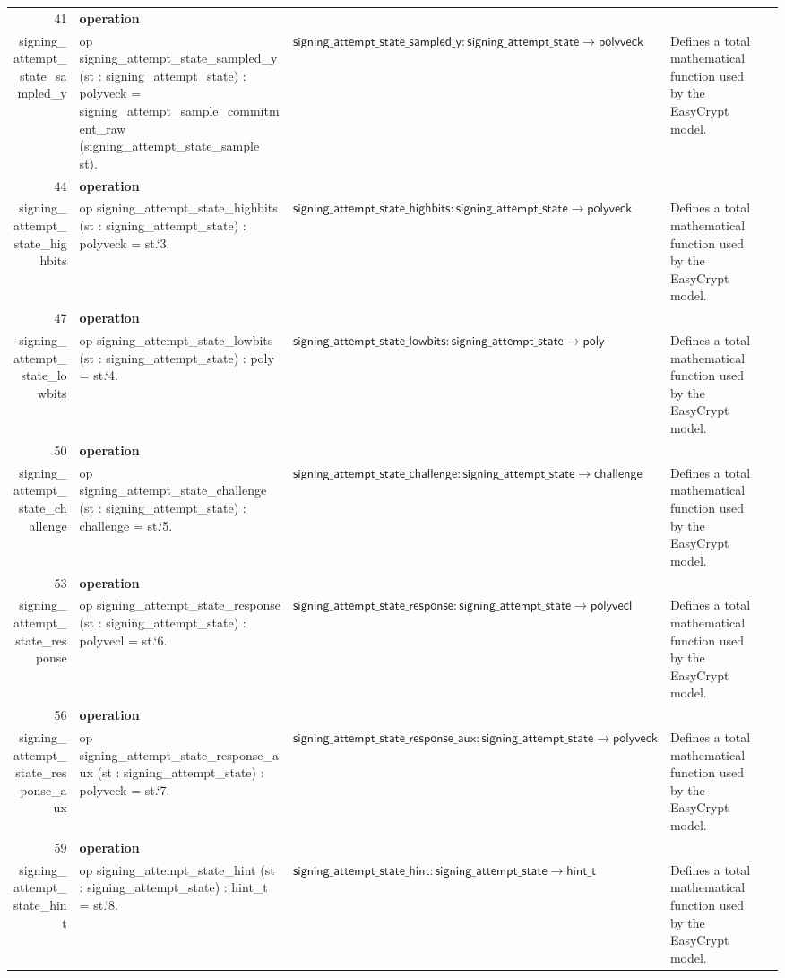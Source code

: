 \documentclass[10pt]{article}
\newcommand{\ec}[1]{\begingroup\ttfamily\scriptsize #1\endgroup}
\begin{document}
\begin{longtable}{r L{0.17\textwidth} L{0.26\textwidth} L{0.27\textwidth} L{0.20\textwidth}}
41 & \textbf{operation}\\\ec{signing\_attempt\_state\_sampled\_y} & \ec{op signing\_attempt\_state\_sampled\_y (st : signing\_attempt\_state) : polyveck = signing\_attempt\_sample\_commitment\_raw (signing\_attempt\_state\_sample st).} & \(\mathsf{signing\_attempt\_state\_sampled\_y} : \mathsf{signing\_attempt\_state} \to \mathsf{polyveck}\) & Defines a total mathematical function used by the EasyCrypt model. \\
44 & \textbf{operation}\\\ec{signing\_attempt\_state\_highbits} & \ec{op signing\_attempt\_state\_highbits (st : signing\_attempt\_state) : polyveck = st.`3.} & \(\mathsf{signing\_attempt\_state\_highbits} : \mathsf{signing\_attempt\_state} \to \mathsf{polyveck}\) & Defines a total mathematical function used by the EasyCrypt model. \\
47 & \textbf{operation}\\\ec{signing\_attempt\_state\_lowbits} & \ec{op signing\_attempt\_state\_lowbits (st : signing\_attempt\_state) : poly = st.`4.} & \(\mathsf{signing\_attempt\_state\_lowbits} : \mathsf{signing\_attempt\_state} \to \mathsf{poly}\) & Defines a total mathematical function used by the EasyCrypt model. \\
50 & \textbf{operation}\\\ec{signing\_attempt\_state\_challenge} & \ec{op signing\_attempt\_state\_challenge (st : signing\_attempt\_state) : challenge = st.`5.} & \(\mathsf{signing\_attempt\_state\_challenge} : \mathsf{signing\_attempt\_state} \to \mathsf{challenge}\) & Defines a total mathematical function used by the EasyCrypt model. \\
53 & \textbf{operation}\\\ec{signing\_attempt\_state\_response} & \ec{op signing\_attempt\_state\_response (st : signing\_attempt\_state) : polyvecl = st.`6.} & \(\mathsf{signing\_attempt\_state\_response} : \mathsf{signing\_attempt\_state} \to \mathsf{polyvecl}\) & Defines a total mathematical function used by the EasyCrypt model. \\
56 & \textbf{operation}\\\ec{signing\_attempt\_state\_response\_aux} & \ec{op signing\_attempt\_state\_response\_aux (st : signing\_attempt\_state) : polyveck = st.`7.} & \(\mathsf{signing\_attempt\_state\_response\_aux} : \mathsf{signing\_attempt\_state} \to \mathsf{polyveck}\) & Defines a total mathematical function used by the EasyCrypt model. \\
59 & \textbf{operation}\\\ec{signing\_attempt\_state\_hint} & \ec{op signing\_attempt\_state\_hint (st : signing\_attempt\_state) : hint\_t = st.`8.} & \(\mathsf{signing\_attempt\_state\_hint} : \mathsf{signing\_attempt\_state} \to \mathsf{hint\_t}\) & Defines a total mathematical function used by the EasyCrypt model. \\

\end{longtable}
\end{document}
